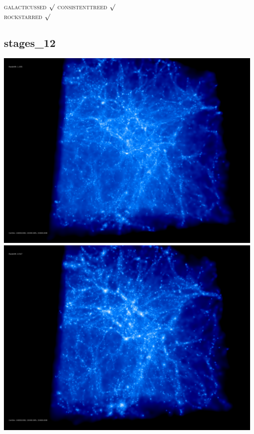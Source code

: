 \textsc{galacticussed} $\surd$
\textsc{consistenttreed} $\surd$ \\ 
\textsc{rockstarred} $\surd$
 
% 
%
%
%
%
%
%
%

\newpage
\subsection{stages\_12}

\includegraphics[scale=0.1]{stages_12/50.jpg} 
\includegraphics[scale=0.1]{stages_12/100.jpg}  \\

